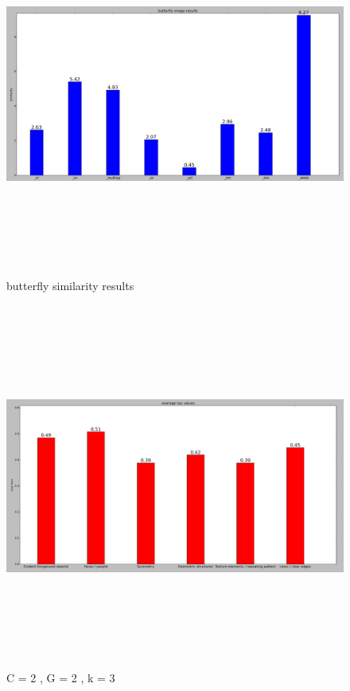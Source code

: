 		\begin{figure}[h] \label{bf_id}
			\includegraphics[width=\linewidth,height=12cm,keepaspectratio]{Figures/bf_id}
			\caption[butterfly similarity results]
			{butterfly similarity results}
		\end{figure}
		
		\begin{figure}[h] \label{c2g2k3}
			\includegraphics[width=\linewidth,height=12cm,keepaspectratio]{Figures/c2g2k3}
			\caption[C = 2 , G = 2 , k = 3]
			{C = 2 , G = 2 , k = 3}
		\end{figure}
		
